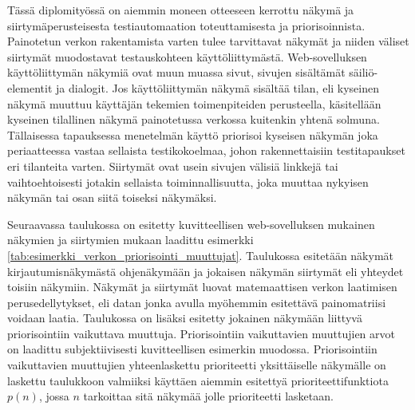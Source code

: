   Tässä diplomityössä on aiemmin moneen otteeseen kerrottu näkymä ja siirtymäperusteisesta testiautomaation toteuttamisesta ja priorisoinnista.
  Painotetun verkon rakentamista varten tulee tarvittavat näkymät ja niiden väliset siirtymät muodostavat testauskohteen käyttöliittymästä.
  Web-sovelluksen käyttöliittymän näkymiä ovat muun muassa sivut, sivujen sisältämät säiliö-elementit ja dialogit.
  Jos käyttöliittymän näkymä sisältää tilan, eli kyseinen näkymä muuttuu käyttäjän tekemien toimenpiteiden perusteella, käsitellään kyseinen tilallinen näkymä painotetussa verkossa kuitenkin yhtenä solmuna.
  Tällaisessa tapauksessa menetelmän käyttö priorisoi kyseisen näkymän joka periaatteessa vastaa sellaista testikokoelmaa, johon rakennettaisiin testitapaukset eri tilanteita varten.
  Siirtymät ovat usein sivujen välisiä linkkejä tai vaihtoehtoisesti jotakin sellaista toiminnallisuutta, joka muuttaa nykyisen näkymän tai osan siitä toiseksi näkymäksi.

  Seuraavassa taulukossa on esitetty kuvitteellisen web-sovelluksen mukainen näkymien ja siirtymien mukaan laadittu esimerkki \ref{tab:esimerkki_verkon_priorisointi_muuttujat}.
  Taulukossa esitetään näkymät kirjautumisnäkymästä ohjenäkymään ja jokaisen näkymän siirtymät eli yhteydet toisiin näkymiin.
  Näkymät ja siirtymät luovat matemaattisen verkon laatimisen perusedellytykset, eli datan jonka avulla myöhemmin esitettävä painomatriisi voidaan laatia.
  Taulukossa on lisäksi esitetty jokainen näkymään liittyvä priorisointiin vaikuttava muuttuja.
  Priorisointiin vaikuttavien muuttujien arvot on laadittu subjektiivisesti kuvitteellisen esimerkin muodossa.
  Priorisointiin vaikuttavien muuttujien yhteenlaskettu prioriteetti yksittäiselle näkymälle on laskettu taulukkoon valmiiksi käyttäen aiemmin esitettyä prioriteettifunktiota \(p(n)\), jossa \(n\) tarkoittaa sitä näkymää jolle prioriteetti lasketaan.

